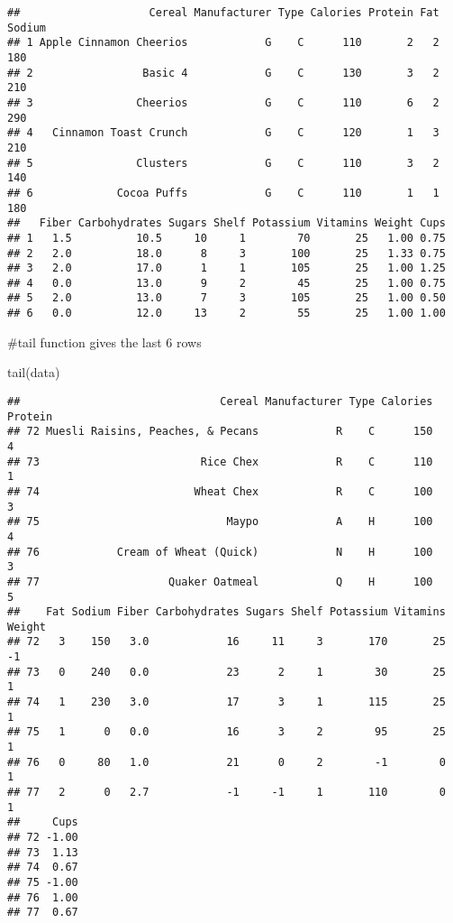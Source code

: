 \documentclass[]{article}
\newenvironment{Shaded}{\begin{snugshade}}{\end{snugshade}}
\newcommand{\FunctionTok}[1]{\textcolor[rgb]{0.00,0.00,0.00}{#1}}
\newcommand{\NormalTok}[1]{#1}
\begin{document}
\begin{verbatim}
##                    Cereal Manufacturer Type Calories Protein Fat Sodium
## 1 Apple Cinnamon Cheerios            G    C      110       2   2    180
## 2                 Basic 4            G    C      130       3   2    210
## 3                Cheerios            G    C      110       6   2    290
## 4   Cinnamon Toast Crunch            G    C      120       1   3    210
## 5                Clusters            G    C      110       3   2    140
## 6             Cocoa Puffs            G    C      110       1   1    180
##   Fiber Carbohydrates Sugars Shelf Potassium Vitamins Weight Cups
## 1   1.5          10.5     10     1        70       25   1.00 0.75
## 2   2.0          18.0      8     3       100       25   1.33 0.75
## 3   2.0          17.0      1     1       105       25   1.00 1.25
## 4   0.0          13.0      9     2        45       25   1.00 0.75
## 5   2.0          13.0      7     3       105       25   1.00 0.50
## 6   0.0          12.0     13     2        55       25   1.00 1.00
\end{verbatim}

\#tail function gives the last 6 rows

\begin{Shaded}
\begin{Highlighting}[]
\FunctionTok{tail}\NormalTok{(data)}
\end{Highlighting}
\end{Shaded}

\begin{verbatim}
##                               Cereal Manufacturer Type Calories Protein
## 72 Muesli Raisins, Peaches, & Pecans            R    C      150       4
## 73                         Rice Chex            R    C      110       1
## 74                        Wheat Chex            R    C      100       3
## 75                             Maypo            A    H      100       4
## 76            Cream of Wheat (Quick)            N    H      100       3
## 77                    Quaker Oatmeal            Q    H      100       5
##    Fat Sodium Fiber Carbohydrates Sugars Shelf Potassium Vitamins Weight
## 72   3    150   3.0            16     11     3       170       25     -1
## 73   0    240   0.0            23      2     1        30       25      1
## 74   1    230   3.0            17      3     1       115       25      1
## 75   1      0   0.0            16      3     2        95       25      1
## 76   0     80   1.0            21      0     2        -1        0      1
## 77   2      0   2.7            -1     -1     1       110        0      1
##     Cups
## 72 -1.00
## 73  1.13
## 74  0.67
## 75 -1.00
## 76  1.00
## 77  0.67
\end{verbatim}
\end{document}
